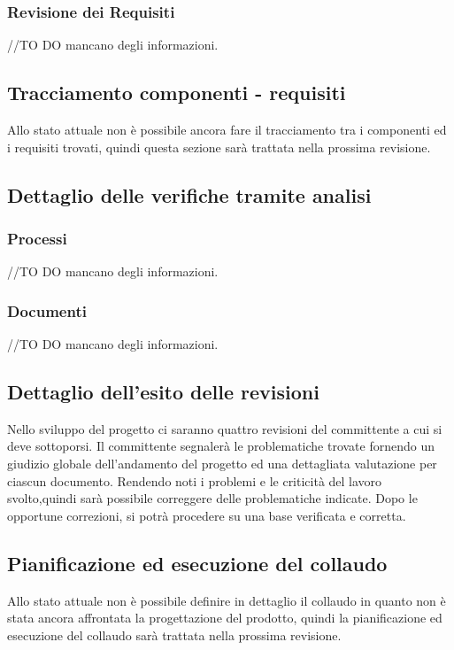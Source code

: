 \documentclass[12pt,a4paper]{article}
\begin{document}
\subsubsection{Revisione dei Requisiti}
//TO DO \IB mancano degli informazioni.
\subsection{Tracciamento componenti - requisiti}
Allo stato attuale non è possibile ancora fare il tracciamento tra i componenti ed i requisiti trovati, quindi questa sezione sarà trattata nella prossima revisione.
\subsection{Dettaglio delle verifiche tramite analisi}
\subsubsection{Processi}
//TO DO \IB mancano degli informazioni.
\subsubsection{Documenti}
//TO DO \IB mancano degli informazioni.
\subsection{Dettaglio dell'esito delle revisioni}
Nello sviluppo del progetto ci saranno quattro revisioni del committente a cui si deve sottoporsi. Il committente segnalerà le problematiche trovate fornendo un giudizio globale dell'andamento del progetto ed una dettagliata valutazione per ciascun documento. Rendendo noti i problemi e le criticità del lavoro svolto,quindi sarà possibile correggere delle problematiche indicate. Dopo le opportune correzioni, si potrà procedere su una base verificata e corretta.
\newpage
\subsection{Pianificazione ed esecuzione del collaudo}
Allo stato attuale non è possibile definire in dettaglio il collaudo in quanto non è stata ancora affrontata la
progettazione del prodotto, quindi la pianificazione ed esecuzione del collaudo sarà trattata nella prossima revisione.
\end{document}
